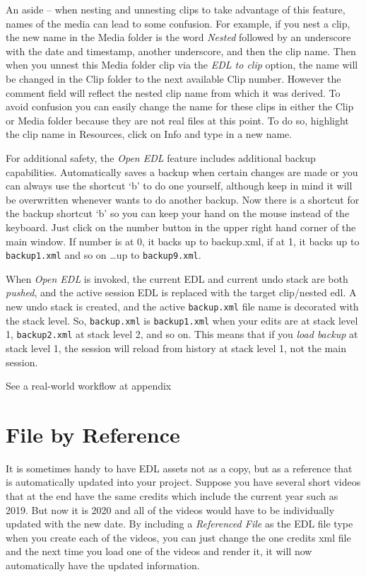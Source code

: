 An aside -- when nesting and unnesting clips to take advantage of
this feature, names of the media can lead to some confusion.  For
example, if you nest a clip, the new name in the Media folder is the
word \textit{Nested} followed by an underscore with the date and
timestamp, another underscore, and then the clip name.  Then when
you unnest this Media folder clip via the \textit{EDL to clip}
option, the name will be changed in the Clip folder to the next
available Clip number.  However the comment field will reflect the
nested clip name from which it was derived.  To avoid confusion you
can easily change the name for these clips in either the Clip or
Media folder because they are not real files at this point. To do
so, highlight the clip name in Resources, click on Info and type in
a new name.

For additional safety, the \textit{Open EDL} feature includes
additional backup capabilities. Automatically \CGG{} saves a backup
when certain changes are made or you can always use the shortcut `b'
to do one yourself, although keep in mind it will be overwritten
whenever \CGG{} wants to do another backup.  Now there is a shortcut
for the backup shortcut `b' so you can keep your hand on the mouse
instead of the keyboard.  Just click on the number button in the upper right
hand corner of the main window.  If number is at 0, it backs up to
backup.xml, if at 1, it backs up to \texttt{backup1.xml} and so on
\dots up to \texttt{backup9.xml}.

When \textit{Open EDL} is invoked, the current EDL and current undo
stack are both \textit{pushed}, and the active session EDL is
replaced with the target clip/nested edl.  A new undo stack is
created, and the active \texttt{backup.xml} file name is decorated
with the stack level.  So, \texttt{backup.xml} is
\texttt{backup1.xml} when your edits are at stack level 1,
\texttt{back\-up2\-.xml} at stack level 2, and so on.  This means
that if you \textit{load backup} at stack level 1, the session will
reload from history at stack level 1, not the main session.

See a real-world workflow at appendix 

\section{File by Reference}%
\label{sec:file_by_reference}

It is sometimes handy to have EDL assets not as a copy, but as a
reference that is automatically updated into your project.  Suppose
you have several short videos that at the end have the same credits
which include the current year such as 2019.  But now it is 2020 and
all of the videos would have to be individually updated with the new
date.  By including a \textit{Referenced File} as the EDL file type
when you create each of the videos, you can just change the one
credits xml file and the next time you load one of the videos and
render it, it will now automatically have the updated information.

